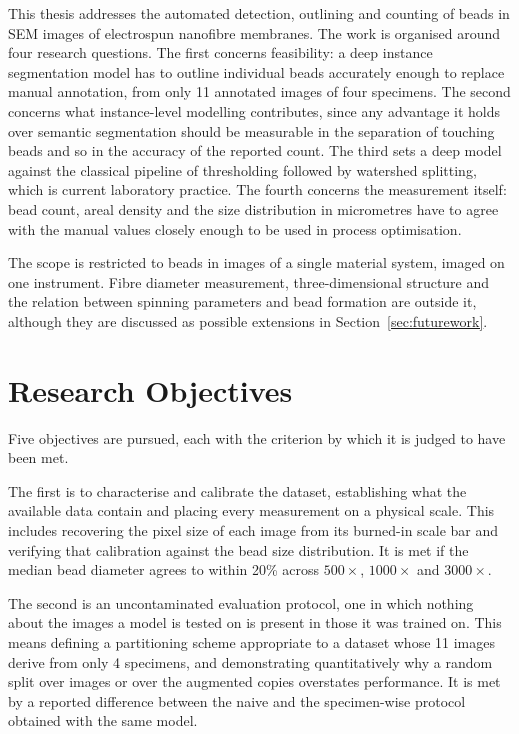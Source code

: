 This thesis addresses the automated detection, outlining and counting of
beads in SEM images of electrospun nanofibre membranes. The work is
organised around four research questions. The first concerns feasibility: a deep
instance segmentation model has to outline individual beads accurately enough to
replace manual annotation, from only 11 annotated images of four specimens. The
second concerns what instance-level modelling contributes, since any advantage it
holds over semantic segmentation should be measurable in the separation of
touching beads and so in the accuracy of the reported count. The third sets a
deep model against the classical pipeline of thresholding followed by watershed
splitting, which is current laboratory practice. The fourth concerns the
measurement itself: bead count, areal density and the size distribution in
micrometres have to agree with the manual values closely enough to be used in
process optimisation.

The scope is restricted to beads in images of a single material
system, imaged on one instrument. Fibre diameter measurement, three-dimensional
structure and the relation between spinning parameters and bead formation are
outside it, although they are discussed as possible extensions in
Section~\ref{sec:futurework}.

\section{Research Objectives}
\label{sec:objectives}

Five objectives are pursued, each with the criterion by which it is judged to
have been met.

The first is to characterise and calibrate the dataset, establishing what the
available data contain and placing every measurement on a physical scale. This
includes recovering the pixel size of each image from its burned-in scale bar and
verifying that calibration against the bead size distribution. It is met if the
median bead diameter agrees to within 20\% across $500\times$, $1000\times$ and
$3000\times$.

The second is an uncontaminated evaluation protocol, one in which nothing about the
images a model is tested on is present in those it was trained on. This means
defining a partitioning scheme appropriate to a dataset whose 11 images derive
from only 4 specimens, and
demonstrating quantitatively why a random split over images or over the augmented
copies overstates performance. It is met by a reported difference between the naive and
the specimen-wise protocol obtained with the same model.

